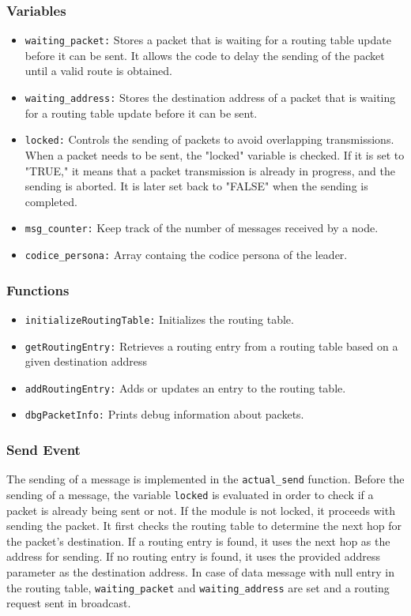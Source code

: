 \documentclass[11pt]{article}
\begin{document}
\subsubsection*{Variables} 
\begin{itemize}
	\item{\texttt{waiting\_packet:}} Stores a packet that is waiting for a routing table update before it can be sent. It allows the code to delay the sending of the packet until a valid route is obtained.
	\item{\texttt{waiting\_address:}} Stores the destination address of a packet that is waiting for a routing table update before it can be sent.
	\item{\texttt{locked:}} Controls the sending of packets to avoid overlapping transmissions. When a packet needs to be sent, the "locked" variable is checked. If it is set to "TRUE," it means that a packet transmission is already in progress, and the sending is aborted. It is later set back to "FALSE" when the sending is completed.
	\item{\texttt{msg\_counter:}} Keep track of the number of messages received by a node.
	\item{\texttt{codice\_persona:}} Array containg the codice persona of the leader.

\end{itemize}
\subsubsection*{Functions}
\begin{itemize}
	\item{\texttt{initializeRoutingTable:}} Initializes the routing table.
	\item{\texttt{getRoutingEntry:}} Retrieves a routing entry from a routing table based on a given destination address
	\item{\texttt{addRoutingEntry:}} Adds or updates an entry to the routing table. 
	\item{\texttt{dbgPacketInfo:}} Prints debug information about packets.
\end{itemize}

\subsubsection*{Send Event}
The sending of a message is implemented in the 	\texttt{actual\_send} function.
Before the sending of a message, the variable \texttt{locked} is evaluated in order to check if a packet is already being sent or not.
If the module is not locked, it proceeds with sending the packet. It first checks the routing table to determine the next hop for the packet's destination. If a routing entry is found, it uses the next hop as the address for sending. If no routing entry is found, it uses the provided address parameter as the destination address.
In case of data message with null entry in the routing table, \texttt{waiting\_packet} and \texttt{waiting\_address} are set and a routing request sent in broadcast.
\end{document}
